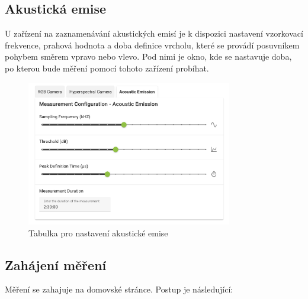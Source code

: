 \documentclass[12pt]{article}
\begin{document}
\begin{teamwork}
        \subsection{Akustická emise}\label{subsec:akusticka-emise}

        U zařízení na zaznamenávání akustických emisí je k dispozici nastavení vzorkovací frekvence, prahová hodnota a doba
        definice vrcholu, které se provádí posuvníkem pohybem směrem vpravo nebo vlevo.
        Pod nimi je okno, kde se nastavuje
        doba, po kterou bude měření pomocí tohoto zařízení probíhat.

        \begin{figure}[hbt!]
            \centering
            \includegraphics[width=0.8\textwidth]{../../img/ae_settings}
            \caption{Tabulka pro nastavení akustické emise}
            \label{fig:ae_settings}
        \end{figure}

        \subsection{Zahájení měření}\label{subsec:zahajeni-mereni}

        Měření se zahajuje na domovské stránce.
        Postup je následující:


\end{teamwork}
\end{document}
